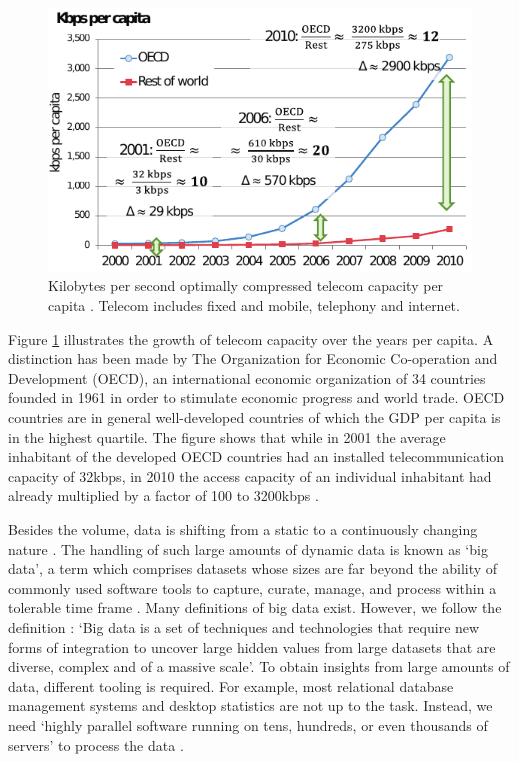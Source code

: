 \begin{figure}[ht!]
\centering
\includegraphics[width=\textwidth]{figures/kbpspercapita.pdf}
\caption[Telecom capacity per capita]{Kilobytes per second optimally compressed telecom capacity per capita \cite{SIGN:SIGN584}. Telecom includes fixed and mobile, telephony and internet. \label{fig:growth}}
\end{figure}

Figure \ref{fig:growth} illustrates the growth of telecom capacity over the years per capita. A distinction has been made by The Organization for Economic Co-operation and Development (OECD), an international economic organization of 34 countries founded in 1961 in order to stimulate economic progress and world trade. OECD countries are in general well-developed countries of which the GDP per capita is in the highest quartile. The figure shows that while in 2001 the average inhabitant of the developed OECD countries had an installed telecommunication capacity of 32kbps, in 2010 the access capacity of an individual inhabitant had already multiplied by a factor of 100 to 3200kbps \cite{SIGN:SIGN584}.

Besides the volume, data is shifting from a static to a continuously changing nature \cite{1558609016}. The handling of such large amounts of dynamic data is known as `big data', a term which comprises datasets whose sizes are far beyond the ability of commonly used software tools to capture, curate, manage, and process within a tolerable time frame \cite{bigdata}. Many definitions of big data exist. However, we follow the definition \cite{Hashem201598}: `Big data is a set of techniques and technologies that require new forms of integration to uncover large hidden values from large datasets that are diverse, complex and of a massive scale'. To obtain insights from large amounts of data, different tooling is required. For example, most relational database management systems and desktop statistics are not up to the task. Instead, we need `highly parallel software running on tens, hundreds, or even thousands of servers' to process the data \cite{Jacobs:2009:PBD:1536616.1536632}.

